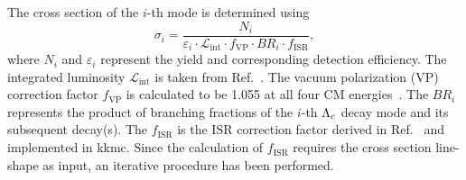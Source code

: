 \documentclass[twocolumn,showpacs,superscriptaddress,amsmath,amssymb]{revtex4-1}
\begin{document}
The cross section of the $i$-th mode is determined using
\begin{equation}
\sigma_{i} = \frac{N_{i}}{\varepsilon_{i}\cdot \mathcal{L}_{\textrm{int}}\cdot f_{\textrm{VP}}\cdot BR_{i}\cdot f_{\textrm{ISR}}},
\label{csformula}
\end{equation}
where $N_{i}$ and $\varepsilon_{i}$ represent the yield and corresponding detection efficiency. The integrated luminosity $\mathcal{L}_{\textrm{int}}$ is taken from Ref.~\cite{LumXYZ,LumRscan}. The vacuum polarization (VP) correction factor $f_{\textrm{VP}}$ is calculated to be 1.055 at all four CM energies~\cite{VPfactor}. The $BR_{i}$ represents the product of branching fractions of the $i$-th $\Lambda_{c}$ decay mode and its subsequent decay(s). The $f_{\textrm{ISR}}$ is the ISR correction factor derived in Ref.~\cite{ISRfactor} and implemented in {\sc kkmc}. Since the calculation of $f_{\textrm{ISR}}$ requires the cross section line-shape as input, an iterative procedure has been performed.
\end{document}
